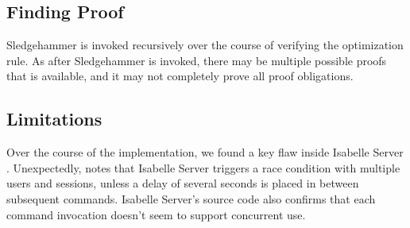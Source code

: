 \documentclass[conference,a4paper,english,10pt]{IEEEtran}[2015/08/26]
\begin{document}


\subsection{Finding Proof}
\label{sec:findproof}


Sledgehammer is invoked recursively over the course of verifying the optimization rule. As after Sledgehammer is invoked, there may be multiple 
possible proofs that is available, and it may not completely prove all proof obligations.

\subsection{Limitations}
\label{sec:limitations}

Over the course of the implementation, we found a key flaw inside Isabelle Server \cite{isabelleSystem}. Unexpectedly, 
\citet{kobschatzki_unexpected_2024} notes that Isabelle Server triggers a race condition with multiple users and sessions, unless a 
delay of several seconds is placed in between subsequent commands. Isabelle Server's source code also confirms that each command invocation 
doesn't seem to support concurrent use.
\end{document}

